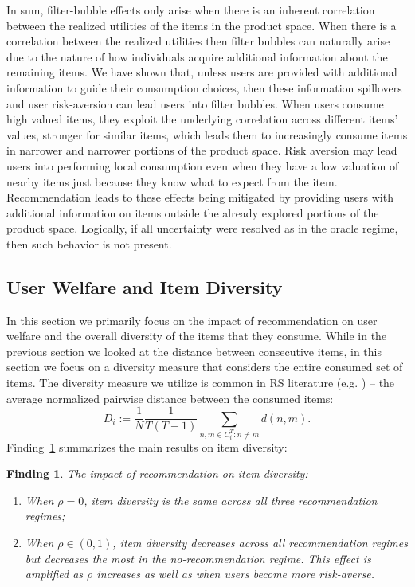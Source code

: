 \documentclass[sigconf]{acmart}
\newtheorem{finding}{Finding}
\begin{document}
In sum, filter-bubble effects only arise when there is an inherent correlation between the realized utilities of the items in the product space. When there is a correlation between the realized utilities then filter bubbles can naturally arise due to the nature of how individuals acquire additional information about the remaining items. We have shown that, unless users are provided with additional information to guide their consumption choices, then these information spillovers and user risk-aversion can lead users into filter bubbles. When users consume high valued items, they exploit the underlying correlation across different items' values, stronger for similar items, which leads them to increasingly consume items in narrower and narrower portions of the product space. Risk aversion may lead users into performing local consumption even when they have a low valuation of nearby items just because they know what to expect from the item. Recommendation leads to these effects being mitigated by providing users with additional information on items outside the already explored portions of the product space. Logically, if all uncertainty were resolved as in the oracle regime, then such behavior is not present.

\subsection{User Welfare and Item Diversity}

In this section we primarily focus on the impact of recommendation on user welfare and the overall diversity of the items that they consume. While in the previous section we looked at the distance between consecutive items, in this section we focus on a diversity measure that considers the entire consumed set of items. The diversity measure we utilize is common in RS literature (e.g. \cite{ziegler2005improving}) -- the average normalized pairwise distance between the consumed items:
$$D_i:=\frac{1}{N}\frac{1}{T(T-1)}\sum_{n,m \in C_i^T: n \ne m} d(n,m).$$
\noindent 
Finding~\ref{finding_diversity} summarizes the main results on item diversity:
\newpage 
\begin{finding}\label{finding_diversity}
The impact of recommendation on item diversity:
\begin{enumerate}
\item When $\rho = 0$, item diversity is the same across all three recommendation regimes;
\item When $\rho \in (0,1)$, item diversity decreases across all recommendation regimes but decreases the most in the no-recommendation regime. This effect is amplified as $\rho$ increases as well as when users become more risk-averse.
\end{enumerate}
\end{finding}
\end{document}

